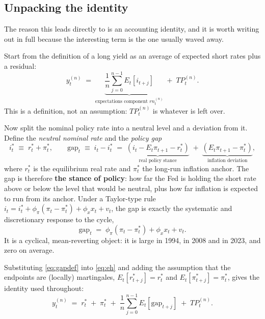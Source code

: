 \subsection{Unpacking the identity}
\label{sec:identity}

The reason this leads directly to \rs{} is an accounting identity, and it is worth writing
out in full because the interesting term is the one usually waved away.

Start from the definition of a long yield as an average of expected short rates plus a
residual:
\begin{equation}
y^{(n)}_t \;=\; \underbrace{\frac{1}{n}\sum_{j=0}^{n-1} E_t\!\left[i_{t+j}\right]}_{\text{expectations component } rn^{(n)}_t} \;+\; TP^{(n)}_t .
\label{eq:eh}
\end{equation}
This is a definition, not an assumption: $TP^{(n)}_t$ is whatever is left over.

Now split the nominal policy rate into a neutral level and a deviation from it. Define the
\emph{neutral nominal rate} and the \emph{policy gap}
\begin{equation}
i^{*}_t \;\equiv\; r^{*}_t + \pi^{*}_t ,
\qquad
\text{gap}_t \;\equiv\; i_t - i^{*}_t \;=\; \underbrace{\left(i_t - E_t\pi_{t+1} - r^{*}_t\right)}_{\text{real policy stance}} \;+\; \underbrace{\left(E_t\pi_{t+1} - \pi^{*}_t\right)}_{\text{inflation deviation}} ,
\label{eq:gapdef}
\end{equation}
where $r^{*}_t$ is the equilibrium real rate and $\pi^{*}_t$ the long-run inflation
anchor. The gap is therefore \textbf{the stance of policy}: how far the Fed is holding the
short rate above or below the level that would be neutral, plus how far inflation is
expected to run from its anchor. Under a Taylor-type rule
$i_t = i^{*}_t + \phi_\pi(\pi_t-\pi^{*}_t) + \phi_x x_t + v_t$, the gap is exactly the
systematic and discretionary response to the cycle,
\begin{equation}
\text{gap}_t \;=\; \phi_\pi\!\left(\pi_t-\pi^{*}_t\right) + \phi_x x_t + v_t .
\label{eq:taylor}
\end{equation}
It is a cyclical, mean-reverting object: it is large in 1994, in 2008 and in 2023, and zero
on average.

Substituting \eqref{eq:gapdef} into \eqref{eq:eh} and adding the assumption that the
endpoints are (locally) martingales, $E_t[r^{*}_{t+j}]=r^{*}_t$ and
$E_t[\pi^{*}_{t+j}]=\pi^{*}_t$, gives the identity used throughout:
\begin{equation}
y^{(n)}_t \;=\; r^{*}_t \;+\; \pi^{*}_t \;+\; \frac{1}{n}\sum_{j=0}^{n-1} E_t\!\left[\text{gap}_{t+j}\right] \;+\; TP^{(n)}_t .
\label{eq:identity}
\end{equation}

